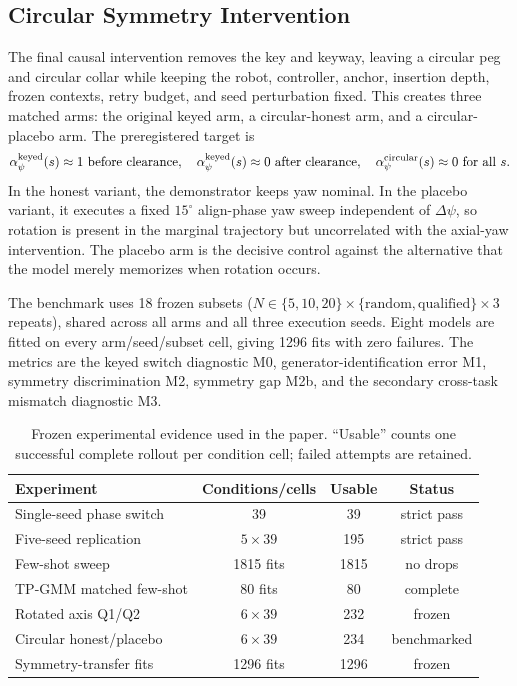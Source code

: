 \documentclass[letterpaper,10pt,conference]{ieeeconf}
\begin{document}
\subsection{Circular Symmetry Intervention}

The final causal intervention removes the key and keyway, leaving a circular
peg and circular collar while keeping the robot, controller, anchor, insertion
depth, frozen contexts, retry budget, and seed perturbation fixed. This creates
three matched arms: the original keyed arm, a circular-honest arm, and a
circular-placebo arm. The preregistered target is
\[
\alpha_\psi^{\rm keyed}(s)\approx 1 \ {\rm before\ clearance},\quad
\alpha_\psi^{\rm keyed}(s)\approx0 \ {\rm after\ clearance},\quad
\alpha_\psi^{\rm circular}(s)\approx0 \ {\rm for\ all}\ s.
\]
In the honest variant, the demonstrator keeps yaw nominal. In the placebo
variant, it executes a fixed $15^\circ$ align-phase yaw sweep independent of
$\Delta\psi$, so rotation is present in the marginal trajectory but
uncorrelated with the axial-yaw intervention. The placebo arm is the decisive
control against the alternative that the model merely memorizes when rotation
occurs.

The benchmark uses 18 frozen subsets
($N\in\{5,10,20\}\times\{\mathrm{random},\mathrm{qualified}\}\times3$
repeats), shared across all arms and all three execution seeds. Eight models
are fitted on every arm/seed/subset cell, giving 1296 fits with zero failures.
The metrics are the keyed switch diagnostic M0, generator-identification error
M1, symmetry discrimination M2, symmetry gap M2b, and the secondary cross-task
mismatch diagnostic M3.

\begin{table}[t]
\centering
\caption{Frozen experimental evidence used in the paper. ``Usable'' counts one
successful complete rollout per condition cell; failed attempts are retained.}
\label{tab:protocol}
\small
\setlength{\tabcolsep}{3.0pt}
\begin{tabular}{lccc}
\toprule
Experiment & Conditions/cells & Usable & Status\\
\midrule
Single-seed phase switch & 39 & 39 & strict pass\\
Five-seed replication & $5\times39$ & 195 & strict pass\\
Few-shot sweep & 1815 fits & 1815 & no drops\\
TP-GMM matched few-shot & 80 fits & 80 & complete\\
Rotated axis Q1/Q2 & $6\times39$ & 232 & frozen\\
Circular honest/placebo & $6\times39$ & 234 & benchmarked\\
Symmetry-transfer fits & 1296 fits & 1296 & frozen\\
\bottomrule
\end{tabular}
\end{table}
\end{document}
